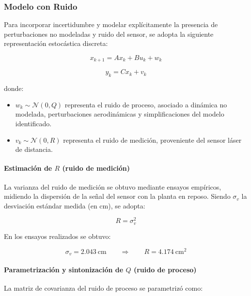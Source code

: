 \subsubsection{Modelo con Ruido}

Para incorporar incertidumbre y modelar explícitamente la presencia de
perturbaciones no modeladas y ruido del sensor, se adopta la siguiente
representación estocástica discreta:

\[
x_{k+1} = A x_k + B u_k + w_k
\]

\[
y_k = C x_k + v_k
\]

donde:

\begin{itemize}
	\item $w_k \sim \mathcal{N}(0,Q)$ representa el ruido de proceso,
	asociado a dinámica no modelada, perturbaciones aerodinámicas
	y simplificaciones del modelo identificado.
	\item $v_k \sim \mathcal{N}(0,R)$ representa el ruido de medición,
	proveniente del sensor láser de distancia.
\end{itemize}

\paragraph{Estimación de $R$ (ruido de medición)}

La varianza del ruido de medición se obtuvo mediante ensayos empíricos,
midiendo la dispersión de la señal del sensor con la planta en reposo.
Siendo $\sigma_v$ la desviación estándar medida (en cm), se adopta:

\[
R = \sigma_v^2
\]

En los ensayos realizados se obtuvo:

\[
\sigma_v = 2.043\ \text{cm}
\qquad\Longrightarrow\qquad
R = 4.174\ \text{cm}^2
\]

\paragraph{Parametrización y sintonización de $Q$ (ruido de proceso)}

La matriz de covarianza del ruido de proceso se parametrizó como:

